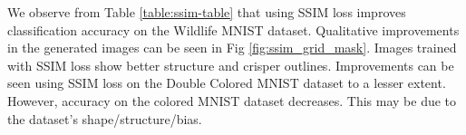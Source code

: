 We observe from Table \ref{table:ssim-table} that using SSIM \cite{wang2004image} loss improves classification accuracy on the Wildlife MNIST dataset. Qualitative improvements in the generated images can be seen in Fig \ref{fig:ssim_grid_mask}. Images trained with SSIM \cite{wang2004image} loss show better structure and crisper outlines. Improvements can be seen using SSIM \cite{wang2004image} loss on the  Double Colored MNIST dataset to a lesser extent. However, accuracy on the colored MNIST dataset decreases. This may be due to the dataset's shape/structure/bias.

